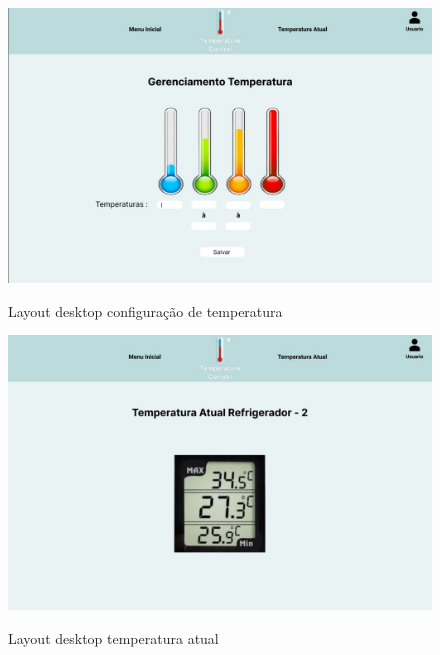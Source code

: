    \begin{figure}[ht]
        \caption{Layout desktop configuração de temperatura}
        \centering
        \includegraphics[scale=0.35]{img/desktop/config_temp.jpeg}
        \label{fig:desktopConfigTemp}
    \end{figure}

    \begin{figure}[ht]
        \caption{Layout desktop temperatura atual}
        \centering
        \includegraphics[scale=0.35]{img/desktop/temp_atual.jpeg}
        \label{fig:desktopTempAtual}
    \end{figure}

